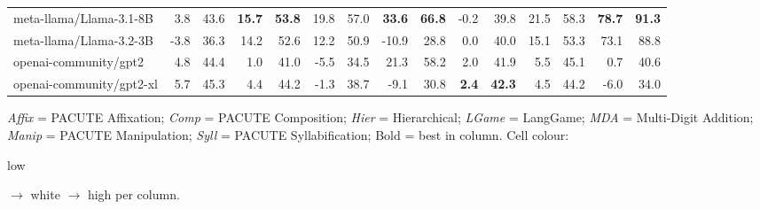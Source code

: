 \documentclass{article}
\begin{document}
\begin{table}[htbp]
\begin{threeparttable}
\begin{adjustbox}{max width=\textwidth}
\begin{tabular}{lrrrrrrrrrrrrrr}
meta-llama/Llama-3.1-8B & \cellcolor[HTML]{F8CBB8}3.8 & \cellcolor[HTML]{F9D2C0}43.6 & \cellcolor[HTML]{92C5DE}\textbf{15.7} & \cellcolor[HTML]{92C5DE}\textbf{53.8} & \cellcolor[HTML]{E6F2F7}19.8 & \cellcolor[HTML]{DBECF4}57.0 & \cellcolor[HTML]{92C5DE}\textbf{33.6} & \cellcolor[HTML]{92C5DE}\textbf{66.8} & \cellcolor[HTML]{ECF5F9}-0.2 & \cellcolor[HTML]{EAF3F8}39.8 & \cellcolor[HTML]{F8C8B3}21.5 & \cellcolor[HTML]{F9D5C5}58.3 & \cellcolor[HTML]{92C5DE}\textbf{78.7} & \cellcolor[HTML]{92C5DE}\textbf{91.3} \\
meta-llama/Llama-3.2-3B & \cellcolor[HTML]{F4A582}-3.8 & \cellcolor[HTML]{F4A582}36.3 & \cellcolor[HTML]{A8D0E4}14.2 & \cellcolor[HTML]{A6CFE4}52.6 & \cellcolor[HTML]{FDF1EC}12.2 & \cellcolor[HTML]{FEFBFA}50.9 & \cellcolor[HTML]{F4AB8A}-10.9 & \cellcolor[HTML]{F4AD8D}28.8 & \cellcolor[HTML]{E4F1F7}0.0 & \cellcolor[HTML]{E2EFF6}40.0 & \cellcolor[HTML]{F6BBA1}15.1 & \cellcolor[HTML]{F7C4AD}53.3 & \cellcolor[HTML]{A0CCE2}73.1 & \cellcolor[HTML]{9BCAE0}88.8 \\
openai-community/gpt2 & \cellcolor[HTML]{F9D0BE}4.8 & \cellcolor[HTML]{FAD7C8}44.4 & \cellcolor[HTML]{F4A582}1.0 & \cellcolor[HTML]{F4A582}41.0 & \cellcolor[HTML]{F4A582}-5.5 & \cellcolor[HTML]{F4A582}34.5 & \cellcolor[HTML]{CBE3EF}21.3 & \cellcolor[HTML]{C1DEEC}58.2 & \cellcolor[HTML]{A1CDE2}2.0 & \cellcolor[HTML]{A0CCE2}41.9 & \cellcolor[HTML]{F4A684}5.5 & \cellcolor[HTML]{F4A786}45.1 & \cellcolor[HTML]{F5B395}0.7 & \cellcolor[HTML]{F6B99E}40.6 \\
openai-community/gpt2-xl & \cellcolor[HTML]{F9D5C5}5.7 & \cellcolor[HTML]{FADCCF}45.3 & \cellcolor[HTML]{F9CEBC}4.4 & \cellcolor[HTML]{F9D1BF}44.2 & \cellcolor[HTML]{F6B79B}-1.3 & \cellcolor[HTML]{F6BBA0}38.7 & \cellcolor[HTML]{F5B294}-9.1 & \cellcolor[HTML]{F6B699}30.8 & \cellcolor[HTML]{92C5DE}\textbf{2.4} & \cellcolor[HTML]{92C5DE}\textbf{42.3} & \cellcolor[HTML]{F4A582}4.5 & \cellcolor[HTML]{F4A582}44.2 & \cellcolor[HTML]{F4A582}-6.0 & \cellcolor[HTML]{F4A582}34.0 \\
\bottomrule
\end{tabular}
\end{adjustbox}
\begin{tablenotes}[flushleft]\footnotesize
\item \textit{Affix} = PACUTE Affixation; \textit{Comp} = PACUTE Composition; \textit{Hier} = Hierarchical; \textit{LGame} = LangGame; \textit{MDA} = Multi-Digit Addition; \textit{Manip} = PACUTE Manipulation; \textit{Syll} = PACUTE Syllabification; Bold = best in column. Cell colour: \colorbox[HTML]{F4A582}{\strut low} $\to$ white $\to$ \colorbox[HTML]{92C5DE}{high} per column.
\end{tablenotes}
\end{threeparttable}
\end{table}
\end{document}
